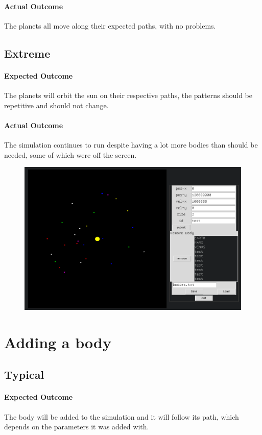 \paragraph{Actual Outcome}
The planets all move along their expected paths, with no problems.

\subsection{Extreme}
\paragraph{Expected Outcome}
The planets will orbit the sun on their respective paths, the patterns should be
repetitive and should not change.
\paragraph{Actual Outcome}
The simulation continues to run despite having a lot more bodies than should be
needed, some of which were off the screen.
\begin{figure}[H]
	\includegraphics[width=\textwidth]{./img/run.png}
\end{figure}


\section{Adding a body}
\subsection{Typical}
\paragraph{Expected Outcome}
The body will be added to the simulation and it will follow its path, which
depends on the parameters it was added with.
